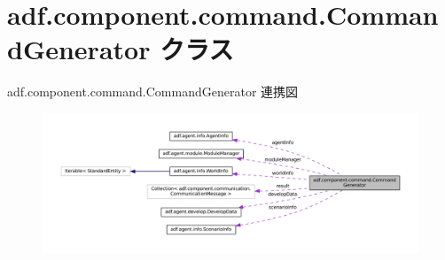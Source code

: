 \hypertarget{classadf_1_1component_1_1command_1_1CommandGenerator}{}\section{adf.\+component.\+command.\+Command\+Generator クラス}
\label{classadf_1_1component_1_1command_1_1CommandGenerator}


adf.\+component.\+command.\+Command\+Generator 連携図
\nopagebreak
\begin{figure}[H]
\begin{center}
\leavevmode
\includegraphics[width=350pt]{classadf_1_1component_1_1command_1_1CommandGenerator__coll__graph}
\end{center}
\end{figure}
